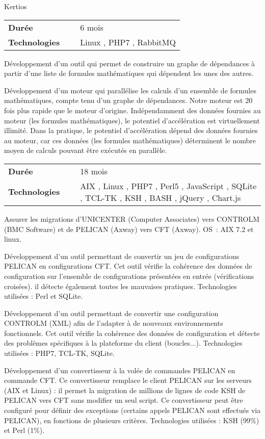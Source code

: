 \documentclass{cv}
\newlength{\companySectionIndentLength}
\newlength{\interSectionTitleContentLength}
\newcommand{\fontTechnoDef}{\setmainfont[Ligatures=TeX]{Ubuntu Mono}}
\newenvironment{sectionContent}{
   \vspace{\interSectionTitleContentLength}\par%
}{%
   \par%
}%
\newcommand{\sectionCompany}[1]{ 
   \vspace{10pt}\par%
   \hspace{\companySectionIndentLength}\begin{tcolorbox}[notitle,
                      nobeforeafter, %
                      bottomrule=2pt,
                      toprule=0pt,
                      leftrule=0pt,
                      rightrule=0pt,
                      top=0pt,
                      bottom=0pt,
                      halign=left,
                      left=0pt,
                      valign=center,
                      width=\textwidth-\companySectionIndentLength]%
       #1%
   \end{tcolorbox}%
   \par%
}%
\newenvironment{technoenv}{%
   \fontTechnoDef
}{}
\newcommand{\techno}[1]{%
   \begin{technoenv}%
   #1%
   \end{technoenv}%
}
\newenvironment{packed_tabular}{
   \setlength{\tabcolsep}{0pt}
}{}
\newcommand{\realisationHeader}[2]{
   \vspace{10pt}\par%
   \begin{tcolorbox}[notitle,
                     nobeforeafter, %
                     bottomrule=0pt,
                     toprule=0pt,
                     leftrule=2pt,
                     rightrule=0pt,
                     top=0pt,
                     bottom=0pt,
                     halign=left,
                     left=0pt,
                     valign=center,
                     width=\textwidth,
                     colback=white]%
      \begin{packed_tabular}
         \begin{tabular}{lll}
            \textbf{Durée}        & ~ & #1 \\
            \textbf{Technologies} & ~ & #2 \\
         \end{tabular}%
      \end{packed_tabular}%
   \end{tcolorbox}%
   \par%
}%
\newenvironment{realisationEnv}{
   \setlength{\parskip}{1em}
}{%
   \par%
}
\begin{document}
   \begin{sectionContent}
      \sectionCompany{Kertios}
   
      \realisationHeader{6 mois}{\techno{Linux}, \techno{PHP7}, \techno{RabbitMQ}}
   
      \begin{realisationEnv}
         Développement d'un outil qui permet de construire un graphe de dépendances à partir d'une liste de formules mathématiques qui dépendent les
         unes des autres.
   
         Développement d'un moteur qui parallélise les calculs d'un ensemble de formules mathématiques, compte tenu d'un graphe de dépendances.
         Notre moteur est 20 fois plus rapide que le moteur d'origine. Indépendamment des données fournies au moteur (les formules mathématiques),
         le potentiel d'accélération est virtuellement illimité. Dans la pratique, le potentiel d'accélération dépend des données fournies au moteur,
         car ces données (les formules mathématiques) déterminent le nombre moyen de calculs pouvant être exécutés en parallèle.
      \end{realisationEnv}
   
      \realisationHeader{18 mois}{\techno{AIX}, \techno{Linux}, \techno{PHP7}, \techno{Perl5}, \techno{JavaScript}, \techno{SQLite}, \techno{TCL-TK}, \techno{KSH}, \techno{BASH}, \techno{jQuery}, \techno{Chart.js}}
   
      \begin{realisationEnv}
         Assurer les migrations d'UNICENTER (Computer Associates) vers CONTROLM (BMC Software) et de PELICAN (Axway) vers CFT (Axway). OS : AIX 7.2
         et linux.
   
         Développement d'un outil permettant de convertir un jeu de configurations PELICAN en configurations CFT. Cet outil vérifie la cohérence des
         données de configuration sur l'ensemble de configurations présentées en entrée (vérifications croisées). il détecte également toutes les
         mauvaises pratiques. Technologies utilisées : Perl et SQLite.
   
         Développement d'un outil permettant de convertir une configuration CONTROLM (XML) afin de l'adapter à de nouveaux environnements fonctionnels.
         Cet outil vérifie la cohérence des données de configuration et détecte des problèmes spécifiques à la plateforme du client (boucles...).
         Technologies utilisées : PHP7, TCL-TK, SQLite.
   
         Développement d'un convertisseur à la volée de commandes PELICAN en commande CFT. Ce convertisseur remplace le client PELICAN sur les serveurs
         (AIX et Linux) : il permet la migration de millions de lignes de code KSH de PELICAN vers CFT sans modifier un seul script. Ce convertisseur
         peut être configuré pour définir des exceptions (certains appels PELICAN sont effectués via PELICAN), en fonctions de plusieurs critères.
         Technologies utilisées : KSH (99\%) et Perl (1\%). 
   

\end{realisationEnv}
\end{sectionContent}
\end{document}
